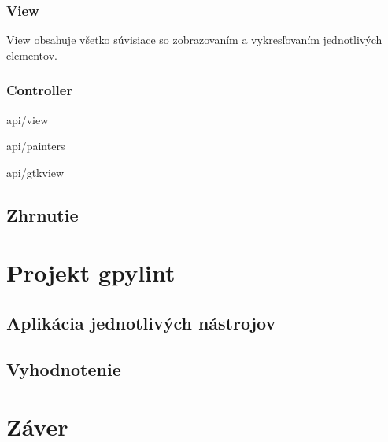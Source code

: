 \documentclass[11pt,oneside,final]{fithesis2}
\begin{document}
    
\subsection{View}
View obsahuje všetko súvisiace so zobrazovaním a vykresľovaním jednotlivých elementov.

\subsection{Controller}

\begin{list}{•}{}
\item api/view
\item api/painters
\item api/gtkview
\end{list}
    
\section{Zhrnutie}    
    
\chapter{Projekt gpylint}
	\section{Aplikácia jednotlivých nástrojov}
	\section{Vyhodnotenie}	

\chapter{Záver}
\end{document}
